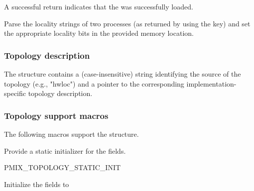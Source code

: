 A successful return indicates that the  was successfully loaded.

\returnsimple

\descr

Parse the locality strings of two processes (as returned by  using the  key) and set the appropriate  locality bits in the provided memory location.

\subsubsection{Topology description}

The  structure contains a (case-insensitive)
string identifying the source of the topology (e.g., "hwloc") and a pointer
to the corresponding implementation-specific topology description.


\subsubsection{Topology support macros}

The following macros support the  structure.


Provide a static initializer for the  fields.

\cspecificstart
\begin{codepar}
PMIX_TOPOLOGY_STATIC_INIT
\end{codepar}
\cspecificend



Initialize the  fields to 

